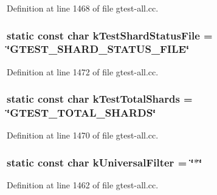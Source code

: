 \-Definition at line 1468 of file gtest-\/all.\-cc.

\hypertarget{namespacetesting_a9f1ab5ec024bf19381dff00e824f6ba7}{
\subsubsection[{k\-Test\-Shard\-Status\-File}]{\setlength{\rightskip}{0pt plus 5cm}static const char {\bf k\-Test\-Shard\-Status\-File} = \char`\"{}\-G\-T\-E\-S\-T\-\_\-\-S\-H\-A\-R\-D\-\_\-\-S\-T\-A\-T\-U\-S\-\_\-\-F\-I\-L\-E\char`\"{}}}\label{d0/d75/namespacetesting_a9f1ab5ec024bf19381dff00e824f6ba7}


\-Definition at line 1472 of file gtest-\/all.\-cc.

\hypertarget{namespacetesting_a9d9ddd278cfbb5834dea812d0de529be}{
\subsubsection[{k\-Test\-Total\-Shards}]{\setlength{\rightskip}{0pt plus 5cm}static const char {\bf k\-Test\-Total\-Shards} = \char`\"{}\-G\-T\-E\-S\-T\-\_\-\-T\-O\-T\-A\-L\-\_\-\-S\-H\-A\-R\-D\-S\char`\"{}}}\label{d0/d75/namespacetesting_a9d9ddd278cfbb5834dea812d0de529be}


\-Definition at line 1470 of file gtest-\/all.\-cc.

\hypertarget{namespacetesting_a1bf2eaf73b98e0bc07b11550f91986a1}{
\subsubsection[{k\-Universal\-Filter}]{\setlength{\rightskip}{0pt plus 5cm}static const char {\bf k\-Universal\-Filter} = \char`\"{}$\ast$\char`\"{}}}\label{d0/d75/namespacetesting_a1bf2eaf73b98e0bc07b11550f91986a1}


\-Definition at line 1462 of file gtest-\/all.\-cc.

